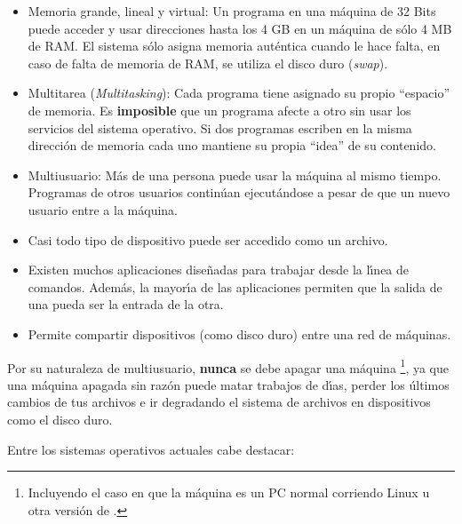 \begin{itemize}
  
\item Memoria grande, lineal y virtual: Un programa en una m{\'a}quina de
  32 Bits puede acceder y usar direcciones hasta los 4 GB en un
  m{\'a}quina de s{\'o}lo 4 MB de RAM. El sistema s{\'o}lo asigna memoria
  aut{\'e}ntica cuando le hace falta, en caso de falta de memoria de RAM,
  se utiliza el disco duro ({\it swap}).
  
\item Multitarea ({\it Multitasking}): Cada programa tiene asignado su
  propio ``espacio'' de memoria. Es {\bf imposible} que un programa
  afecte a otro sin usar los servicios del sistema operativo.  Si dos
  programas escriben en la misma direcci{\'o}n de memoria cada uno
  mantiene su propia ``idea'' de su contenido.
  
\item Multiusuario: M{\'a}s de una persona puede usar la m{\'a}quina al mismo
  tiempo. Programas de otros usuarios contin{\'u}an ejecut{\'a}ndose a pesar
  de que un nuevo usuario entre a la m{\'a}quina.
  
\item Casi todo tipo de dispositivo puede ser accedido como un
  archivo.
  
\item Existen muchos aplicaciones dise{\~n}adas para trabajar desde la
  l{\'\i}nea de comandos. Adem{\'a}s, la mayor{\'\i}a de las aplicaciones permiten que
  la salida de una pueda ser la entrada de la otra.

\item Permite compartir dispositivos (como disco duro) entre una red
  de m{\'a}quinas.

\end{itemize}

Por su naturaleza de multiusuario, {\bf nunca} se debe apagar una
m{\'a}quina {\unix}\footnote{Incluyendo el caso en que la m{\'a}quina es un PC
  normal corriendo Linux u otra versi{\'o}n de {\unix}.}, ya que una
m{\'a}quina apagada sin raz{\'o}n puede matar trabajos de d{\'\i}as, perder los
{\'u}ltimos cambios de tus archivos e ir degradando el sistema de archivos
en dispositivos como el disco duro.

Entre los sistemas operativos {\unix} actuales cabe destacar:

